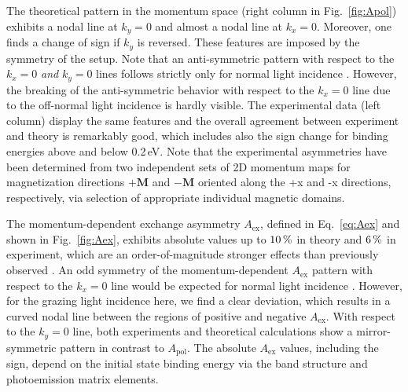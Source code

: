 \documentclass[prl,twocolumn,floatfix,superscriptaddress,aps]{revtex4-2}
\renewcommand{\vec}[1]{\boldsymbol{#1}}
\begin{document}
The theoretical pattern in the momentum space (right column in Fig.~\ref{fig:Apol}) exhibits a nodal line at $k_{y} = 0$ and almost a nodal line at $k_{x} = 0$. Moreover, one finds a change of sign if $k_{y}$ is reversed. These features are imposed by the symmetry of the setup. Note that an anti-symmetric pattern with respect to the $k_{x} = 0$ \textit{and} $k_{y} = 0$ lines follows strictly only for normal light incidence \cite{schumann2024}. However, the breaking of the anti-symmetric behavior with respect to the $k_{x} = 0$ line due to the off-normal light incidence is hardly visible. The experimental data (left column) display the same features and the overall agreement between experiment and theory is remarkably good, which includes also the sign change for binding energies above and below 0.2\,eV. Note that the experimental asymmetries have been determined from two independent sets of 2D momentum maps for magnetization directions $+\vec{M}$ and $-\vec{M}$ oriented along the +x and -x directions, respectively, via selection of appropriate individual magnetic domains.

The momentum-dependent exchange asymmetry $A_{\mathrm{ex}}$, defined in Eq.~\eqref{eq:Aex} and shown in Fig.~\ref{fig:Aex}, exhibits absolute values up to $\unit[10]{\%}$ in theory and $\unit[6]{\%}$ in experiment, which are an order-of-magnitude stronger effects than previously observed \cite{marx2000}. An odd symmetry of the momentum-dependent $A_{\mathrm{ex}}$ pattern with respect to the $k_{x} = 0$ line would be expected for normal light incidence \cite{schumann2024}. However, for the grazing light incidence here, we find a clear deviation, which results in a curved nodal line between the regions of positive and negative $A_{\mathrm{ex}}$. With respect to the $k_{y} = 0$ line, both experiments and theoretical calculations show a mirror-symmetric pattern in contrast to $A_{\mathrm{pol}}$. The absolute $A_{\mathrm{ex}}$ values, including the sign, depend on the initial state binding energy via the band structure and photoemission matrix elements.
\end{document}
